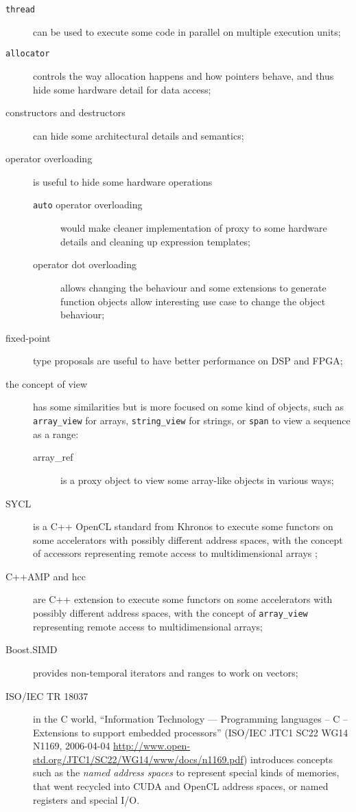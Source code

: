 \documentclass[a4paper]{article}
\begin{document}
\begin{description}
\item[\texttt{thread}] can be used to execute some code in parallel
  on multiple execution units;
\item[\texttt{allocator}] controls the way allocation happens and how
  pointers behave, and thus hide some hardware detail for data access;
\item[constructors and destructors] can hide some architectural details
  and semantics;
\item[operator overloading] is useful to hide some hardware
  operations
  \begin{description}
  \item[\texttt{auto} operator overloading] would make cleaner
    implementation of proxy to some hardware details and cleaning up
    expression templates;
  \item[operator dot overloading] \cite{C++:P00252R0:dot_operator}
    allows changing the behaviour and some extensions to generate
    function objects \cite{C++:P0060R0:function_operator_dot} allow
    interesting use case to change the object behaviour;
  \end{description}
\item[fixed-point] type proposals are useful to have better
  performance on DSP and FPGA;
\item[the concept of view] has some similarities but is more focused
  on some kind of objects, such as \lstinline|array_view| for arrays,
  \lstinline|string_view| for strings, or \lstinline|span| to view a
  sequence as a range:
  \begin{description}
  \item[array\_ref] \cite{C++:P0009R1:array_ref} is a proxy object to
    view some array-like objects in various ways;
  \end{description}
\item[SYCL] is a C++ OpenCL standard from Khronos to execute some
  functors on some accelerators with possibly different address
  spaces, with the concept of accessors representing remote access to
  multidimensional arrays \cite{C++:P00236R0:SYCL};
\item[C++AMP and hcc] \cite{C++:P0069R0:hcc} are C++ extension to
  execute some functors on some accelerators with possibly different
  address spaces, with the concept of \lstinline|array_view|
  representing remote access to multidimensional arrays;

\item[Boost.SIMD] \cite{Boost:SIMD} provides non-temporal iterators
  and ranges to work on vectors;

\item[ISO/IEC TR 18037] in the C world, ``Information Technology ---
  Programming languages -- C -- Extensions to support embedded
  processors'' (ISO/IEC JTC1 SC22 WG14 N1169, 2006-04-04
  \url{http://www.open-std.org/JTC1/SC22/WG14/www/docs/n1169.pdf})
  introduces concepts such as the \emph{named address spaces} to
  represent special kinds of memories, that went recycled into CUDA
  and OpenCL address spaces, or named registers and special I/O.
\end{description}
\end{document}
